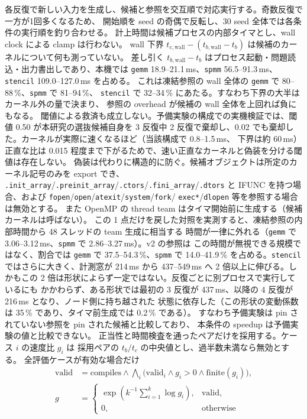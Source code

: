 \documentclass[conference,letterpaper]{IEEEtran}
\begin{document}
各反復で新しい入力を生成し、候補と参照を交互順で対応実行する。奇数反復で一方が1回多くなるため、
開始順を seed の奇偶で反転し、30 seed 全体では各条件の実行順を釣り合わせる。
計上時間は候補プロセスの内部タイマとし、wall clock による clamp は行わない。
wall 下界 $t_{c,\mathrm{wall}}-(t_{b,\mathrm{wall}}-t_b)$ は候補のカーネルについて何も測っていない。
差し引く $t_{b,\mathrm{wall}}-t_b$ はプロセス起動・問題読込・出力書出しであり、本機では
\texttt{gemm} 18.9--21.1\,ms、\texttt{spmm} 56.5--91.3\,ms、\texttt{stencil} 109.0--127.0\,ms を占める。
これは凍結参照の wall 全体の \texttt{gemm} で 80--88\,\%、\texttt{spmm} で 81--94\,\%、
\texttt{stencil} で 32--34\,\% にあたる。すなわち下界の大半はカーネル外の量で決まり、
参照の overhead が候補の wall 全体を上回れば負にもなる。
閾値による救済も成立しない。予備実験の構成での実機検証では、閾値 0.50 が本研究の選抜候補自身を
3 反復中 2 反復で棄却し、0.02 でも棄却した。カーネルが実際に速くなるほど（当該構成で 0.8--1.5\,ms、
下界は約 60\,ms）正直な比は 0.015 程度まで下がるためで、速い正直なカーネルと偽装を分ける閾値は存在しない。
偽装は代わりに構造的に防ぐ。候補オブジェクトは所定のカーネル記号のみを export でき、
\texttt{.init\_array}/\texttt{.preinit\_array}/\texttt{.ctors}/\texttt{.fini\_array}/\texttt{.dtors} と
IFUNC を持つ場合、および \texttt{fopen}/\texttt{open}/\texttt{atexit}/\texttt{system}/\texttt{fork}/
\texttt{exec*}/\texttt{dlopen} 等を参照する場合は無効とする。
また OpenMP の thread team はタイマ開始前に生成する（候補カーネルは呼ばない）。
この 1 点だけを戻した対照を実測すると、凍結参照の内部時間から 48 スレッドの team 生成に相当する
時間が一律に外れる（\texttt{gemm} で 3.06--3.12\,ms、\texttt{spmm} で 2.86--3.27\,ms）。v2 の参照は
この時間が無視できる規模ではなく、割合では \texttt{gemm} で 37.5--54.3\,\%、\texttt{spmm} で
14.0--41.9\,\% を占める。\texttt{stencil} ではさらに大きく、計測窓が 214\,ms から 437--549\,ms へ
2 倍以上に伸びる。しかもこの 2 倍は形状によらず一定ではない。反復ごとに別プロセスで実行しているにも
かかわらず、ある形状では最初の 3 反復が 437\,ms、以降の 4 反復が 216\,ms となり、ノード側に持ち越された
状態に依存した（この形状の変動係数は 35\,\% であり、タイマ前生成では 0.2\,\% である）。
すなわち予備実験は pin されていない参照を pin された候補と比較しており、
本条件の speedup は予備実験の値と比較できない。
正当性と時間検査を通ったペアだけを採用する。ケース $i$ の速度比 $g_i$ は
採用ペアの $t_{b}/t_{c}$ の中央値とし、\mbox{過半数未満なら無効}とする。
全評価ケースが有効な場合だけ
\begin{align*}
 \mathrm{valid}
   &= \mathrm{compiles}\wedge\bigwedge_i
      \big(\mathrm{valid}_i\wedge g_i>0\wedge\mathrm{finite}(g_i)\big),\\
 g &=
 \begin{cases}
 \exp\!\left(k^{-1}\sum_{i=1}^{k}\log g_i\right), & \mathrm{valid},\\
 0, & \mathrm{otherwise}
 \end{cases}
\end{align*}
\end{document}
